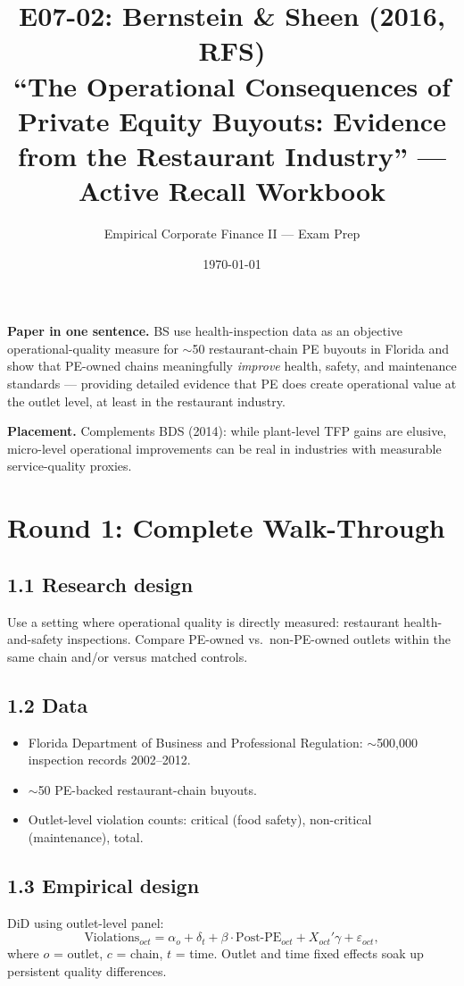 \documentclass[11pt]{article}
\title{E07-02: Bernstein \& Sheen (2016, RFS) \\
\large ``The Operational Consequences of Private Equity Buyouts: Evidence from the Restaurant Industry'' --- Active Recall Workbook}
\author{Empirical Corporate Finance II --- Exam Prep}
\date{\today}
\begin{document}
\maketitle

\begin{keybox}
\textbf{Paper in one sentence.} BS use health-inspection data as an objective operational-quality measure for $\sim$50 restaurant-chain PE buyouts in Florida and show that PE-owned chains meaningfully \emph{improve} health, safety, and maintenance standards --- providing detailed evidence that PE does create operational value at the outlet level, at least in the restaurant industry.

\textbf{Placement.} Complements BDS (2014): while plant-level TFP gains are elusive, micro-level operational improvements can be real in industries with measurable service-quality proxies.
\end{keybox}

\section*{Round 1: Complete Walk-Through}

\subsection*{1.1 Research design}
Use a setting where operational quality is directly measured: restaurant health-and-safety inspections. Compare PE-owned vs.\ non-PE-owned outlets within the same chain and/or versus matched controls.

\subsection*{1.2 Data}
\begin{itemize}
\item Florida Department of Business and Professional Regulation: $\sim$500,000 inspection records 2002--2012.
\item $\sim$50 PE-backed restaurant-chain buyouts.
\item Outlet-level violation counts: critical (food safety), non-critical (maintenance), total.
\end{itemize}

\subsection*{1.3 Empirical design}
DiD using outlet-level panel:
\[
\text{Violations}_{oct}=\alpha_o+\delta_t+\beta\cdot\text{Post-PE}_{oct}+X_{oct}'\gamma+\varepsilon_{oct},
\]
where $o$ = outlet, $c$ = chain, $t$ = time. Outlet and time fixed effects soak up persistent quality differences.
\end{document}
